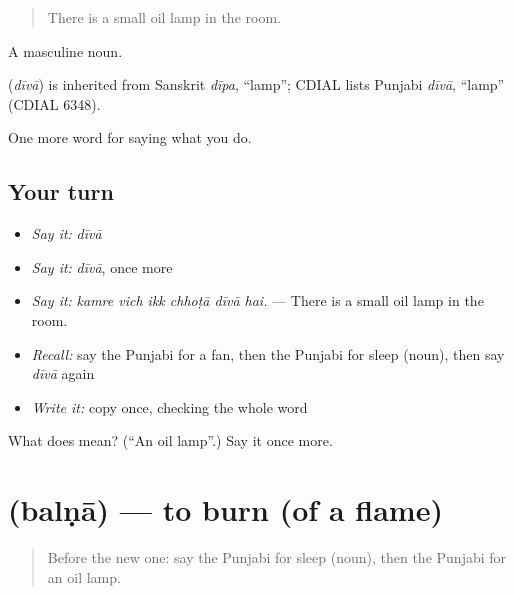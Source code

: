 \begin{quote}
There is a small oil lamp in the room.
\end{quote}

A masculine noun.

\begin{cousinweb}
\textbf{} (\emph{dīvā}) is inherited from Sanskrit \emph{dīpa}, \textquotedblleft{}lamp\textquotedblright{}; CDIAL lists Punjabi \emph{dīvā}, \textquotedblleft{}lamp\textquotedblright{} (CDIAL 6348).
\end{cousinweb}

\begin{grammarlens}[title={What you've built}]
One more word for saying what you do.
\end{grammarlens}

\subsection*{Your turn}
\begin{itemize}
\raggedright
  \item \emph{Say it:} \emph{dīvā}
  \item \emph{Say it:} \emph{dīvā}, once more
  \item \emph{Say it:} \emph{kamre vich ikk chhoṭā dīvā hai.} — There is a small oil lamp in the room.
  \item \emph{Recall:} say the Punjabi for a fan, then the Punjabi for sleep (noun), then say \emph{dīvā} again
  \item \emph{Write it:} copy \textbf{} once, checking the whole word
\end{itemize}

\begin{tcolorbox}[breakable,colback=teal!4,colframe=teal!35!black,title={Before you move on}]
What does  mean? (\textquotedblleft{}An oil lamp\textquotedblright{}.) Say it once more.
\end{tcolorbox}
\section[\texorpdfstring{\pa{ਬਲਣਾ} (balṇā)}{ਬਲਣਾ (balṇā)}]{ (balṇā) — to burn (of a flame)}

\label{lesson:PA-C234-balna}



\begin{quote}
Before the new one: say the Punjabi for sleep (noun), then the Punjabi for an oil lamp.
\end{quote}

